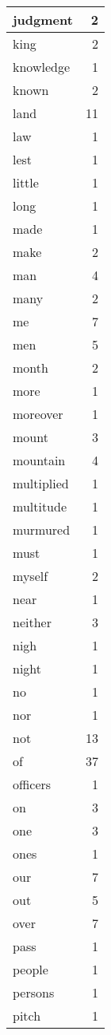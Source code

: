 \begin{center}
\begin{longtable}{l|r}
judgment & 2 \\ \hline
king & 2 \\ \hline
knowledge & 1 \\ \hline
known & 2 \\ \hline
land & 11 \\ \hline
law & 1 \\ \hline
lest & 1 \\ \hline
little & 1 \\ \hline
long & 1 \\ \hline
made & 1 \\ \hline
make & 2 \\ \hline
man & 4 \\ \hline
many & 2 \\ \hline
me & 7 \\ \hline
men & 5 \\ \hline
month & 2 \\ \hline
more & 1 \\ \hline
moreover & 1 \\ \hline
mount & 3 \\ \hline
mountain & 4 \\ \hline
multiplied & 1 \\ \hline
multitude & 1 \\ \hline
murmured & 1 \\ \hline
must & 1 \\ \hline
myself & 2 \\ \hline
near & 1 \\ \hline
neither & 3 \\ \hline
nigh & 1 \\ \hline
night & 1 \\ \hline
no & 1 \\ \hline
nor & 1 \\ \hline
not & 13 \\ \hline
of & 37 \\ \hline
officers & 1 \\ \hline
on & 3 \\ \hline
one & 3 \\ \hline
ones & 1 \\ \hline
our & 7 \\ \hline
out & 5 \\ \hline
over & 7 \\ \hline
pass & 1 \\ \hline
people & 1 \\ \hline
persons & 1 \\ \hline
pitch & 1 \\ \hline

\end{longtable}
\end{center}
